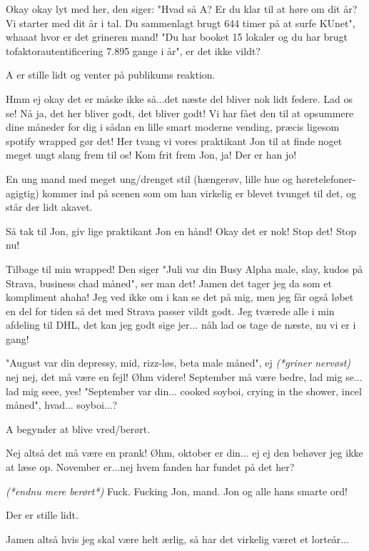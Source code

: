 \documentclass[a4paper,11pt]{article}
\begin{document}
\begin{sketch}
 Okay okay lyt med her, den siger: "Hvad så A? Er du klar til at høre om dit år? Vi starter med dit år i tal. Du sammenlagt brugt 644 timer på at surfe KUnet", whaaat hvor er det grineren mand! "Du har booket 15 lokaler og du har brugt tofaktorautentificering 7.895 gange i år", er det ikke vildt? 

\scene A er stille lidt og venter på publikums reaktion.

Hmm ej okay det er måske ikke så...det næste del bliver nok lidt federe. Lad os se!  
Nå ja, det her bliver godt, det bliver godt! Vi har fået den til at opsummere dine måneder for dig i sådan en lille smart moderne vending, præcis ligesom spotify wrapped gør det! Her tvang vi vores praktikant Jon til at finde noget meget ungt slang frem til os! Kom frit frem Jon, ja! Der er han jo! 

\scene En ung mand med meget ung/drenget stil (hængerøv, lille hue og høretelefoner-agigtig) kommer ind på scenen som om han virkelig er blevet tvunget til det, og står der lidt akavet.

 Så tak til Jon, giv lige praktikant Jon en hånd!  Okay det er nok! Stop det! Stop nu! 

 Tilbage til min wrapped! Den siger "Juli var din Busy Alpha male, slay, kudos på Strava, business chad måned", ser man det! Jamen det tager jeg da som et kompliment ahaha! Jeg ved ikke om i kan se det på mig, men jeg får også løbet en del for tiden så det med Strava passer vildt godt. Jeg tværede alle i min afdeling til DHL, det kan jeg godt sige jer... nåh lad os tage de næste, nu vi er i gang! 

 "August var din depressy, mid, rizz-løs, beta male måned", ej \textit{(*griner nervøst)} nej nej, det må være en fejl! Øhm videre! September må være bedre, lad mig se... lad mig seee, yes! "September var din... cooked soyboi, crying in the shower, incel måned", hvad... soyboi...? 

\scene A begynder at blive vred/berørt. 

 Nej altså det må være en prank! Øhm, oktober er din... ej ej den behøver jeg ikke at læse op. November er...nej  hvem fanden har fundet på det her?  

 \textit{(*endnu mere berørt*)} Fuck. Fucking Jon, mand. Jon og alle hans smarte ord! 


\scene Der er stille lidt. 

 Jamen altså hvis jeg skal være helt ærlig, så har det virkelig været et lorteår... 


\end{sketch}
\end{document}
